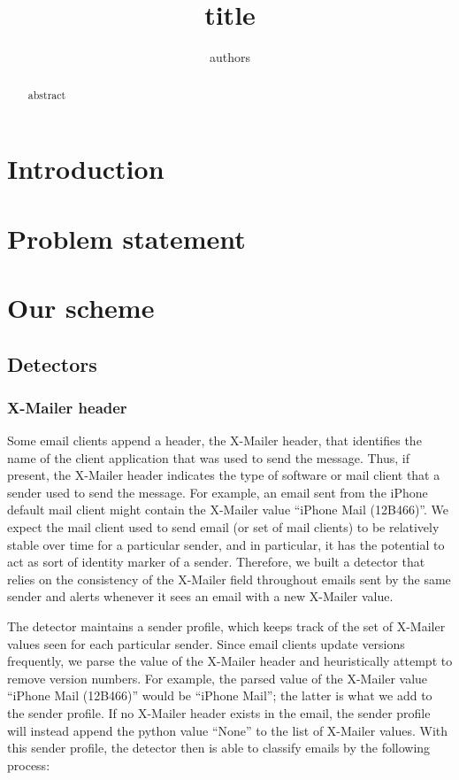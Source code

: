 \documentclass[letterpaper]{article}
\begin{document}
\title{title}
\author{authors}
\maketitle

\begin{abstract}
abstract
\end{abstract}

\section{Introduction}
\section{Problem statement}
\section{Our scheme}

\subsection{Detectors}
\subsubsection{X-Mailer header}

Some email clients append a header, the X-Mailer header, that identifies the name of the client application that was used to send the message.
Thus, if present, the X-Mailer header indicates the type of software or mail client that a sender used to send the message.
For example, an email sent from the iPhone default mail client might contain the X-Mailer value ``iPhone Mail (12B466)''.
We expect the mail client used to send email (or set of mail clients) to be relatively stable over time for a particular sender, and in particular, it has the potential to act as sort of identity marker of a sender.
Therefore, we built a detector that relies on the consistency of the X-Mailer field throughout emails sent by the same sender and alerts whenever it sees an email with a new X-Mailer value.

The detector maintains a sender profile, which keeps track of the set of X-Mailer values seen for each particular sender.
Since email clients update versions frequently, we parse the value of the X-Mailer header and heuristically attempt to remove version numbers.
For example, the parsed value of the X-Mailer value ``iPhone Mail (12B466)'' would be ``iPhone Mail'';
the latter is what we add to the sender profile.
If no X-Mailer header exists in the email, the sender profile will instead append the python value ``None'' to the list of X-Mailer values. With this sender profile, the detector then is able to classify emails by the following process:
\end{document}
